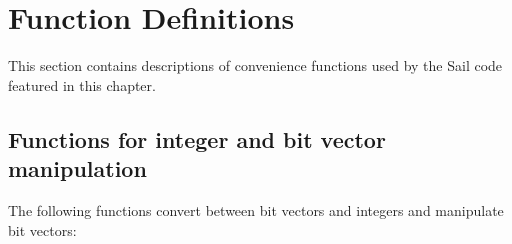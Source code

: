 \label{sailRISCVzcapzyhpermszywidth}
\sailRISCVtypecapHpermsWidth{}
\label{sailRISCVzcapzyupermszywidth}
\sailRISCVtypecapUpermsWidth{}
\label{sailRISCVzcapzyupermszyshift}
\sailRISCVtypecapUpermsShift{}
\label{sailRISCVzcapzyflagszywidth}
\sailRISCVtypecapFlagsWidth{}
\label{sailRISCVzcapzyotypezywidth}
\sailRISCVtypecapOtypeWidth{}

\label{sailRISCVzcapzymaxzyotype}
\sailRISCVletcapMaxOtype{}

\section{Function Definitions}

This section contains descriptions of convenience functions used by the Sail code featured in this chapter.

\subsection*{Functions for integer and bit vector manipulation}

The following functions convert between bit vectors and integers and manipulate bit vectors:

\medskip
{}


\label{sailRISCVzEXTZ}

\label{sailRISCVzEXTS}

\label{sailRISCVzzzeros}

